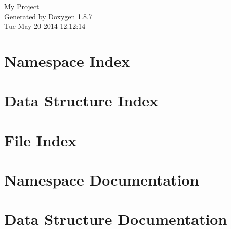 \documentclass[twoside]{book}
\newcommand{\+}{\discretionary{\mbox{\scriptsize$\hookleftarrow$}}{}{}}
\newcommand{\clearemptydoublepage}{%
  \newpage{\pagestyle{empty}\cleardoublepage}%
}
\begin{document}
\hypersetup{pageanchor=false,
             bookmarks=true,
             bookmarksnumbered=true,
             pdfencoding=unicode
            }
\begin{titlepage}
\vspace*{7cm}
\begin{center}%
{\Large My Project }\\
\vspace*{1cm}
{\large Generated by Doxygen 1.8.7}\\
\vspace*{0.5cm}
{\small Tue May 20 2014 12:12:14}\\
\end{center}
\end{titlepage}
\clearemptydoublepage
\tableofcontents
\clearemptydoublepage
{}
\hypersetup{pageanchor=true}

\chapter{Namespace Index}

\chapter{Data Structure Index}

\chapter{File Index}

\chapter{Namespace Documentation}

\chapter{Data Structure Documentation}



\end{document}
